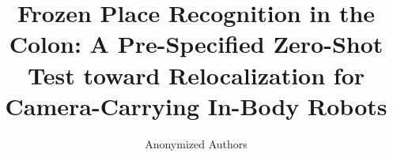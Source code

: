 \documentclass[runningheads]{llncs}
\begin{document}
\title{Frozen Place Recognition in the Colon: A Pre-Specified
Zero-Shot Test toward Relocalization for Camera-Carrying In-Body Robots}

\author{Anonymized Authors}

\maketitle












\end{document}
